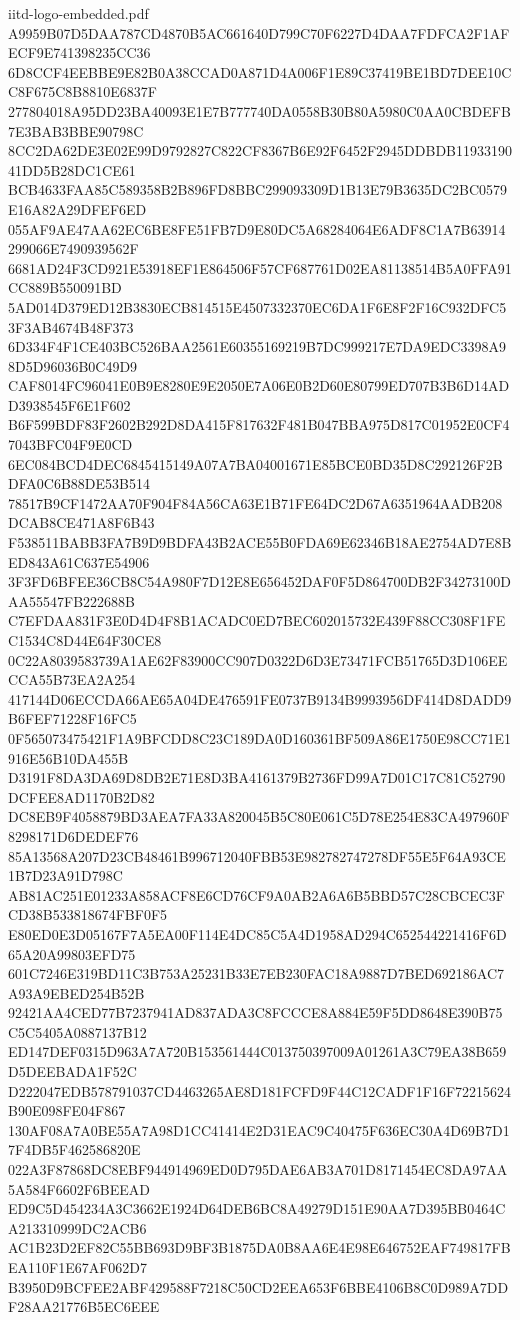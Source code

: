 \begin{filecontents*}[overwrite]{iitd-logo-embedded.pdf}
A9959B07D5DAA787CD4870B5AC661640D799C70F6227D4DAA7FDFCA2F1AFECF9E741398235CC36
6D8CCF4EEBBE9E82B0A38CCAD0A871D4A006F1E89C37419BE1BD7DEE10CC8F675C8B8810E6837F
277804018A95DD23BA40093E1E7B777740DA0558B30B80A5980C0AA0CBDEFB7E3BAB3BBE90798C
8CC2DA62DE3E02E99D9792827C822CF8367B6E92F6452F2945DDBDB1193319041DD5B28DC1CE61
BCB4633FAA85C589358B2B896FD8BBC299093309D1B13E79B3635DC2BC0579E16A82A29DFEF6ED
055AF9AE47AA62EC6BE8FE51FB7D9E80DC5A68284064E6ADF8C1A7B63914299066E7490939562F
6681AD24F3CD921E53918EF1E864506F57CF687761D02EA81138514B5A0FFA91CC889B550091BD
5AD014D379ED12B3830ECB814515E4507332370EC6DA1F6E8F2F16C932DFC53F3AB4674B48F373
6D334F4F1CE403BC526BAA2561E60355169219B7DC999217E7DA9EDC3398A98D5D96036B0C49D9
CAF8014FC96041E0B9E8280E9E2050E7A06E0B2D60E80799ED707B3B6D14ADD3938545F6E1F602
B6F599BDF83F2602B292D8DA415F817632F481B047BBA975D817C01952E0CF47043BFC04F9E0CD
6EC084BCD4DEC6845415149A07A7BA04001671E85BCE0BD35D8C292126F2BDFA0C6B88DE53B514
78517B9CF1472AA70F904F84A56CA63E1B71FE64DC2D67A6351964AADB208DCAB8CE471A8F6B43
F538511BABB3FA7B9D9BDFA43B2ACE55B0FDA69E62346B18AE2754AD7E8BED843A61C637E54906
3F3FD6BFEE36CB8C54A980F7D12E8E656452DAF0F5D864700DB2F34273100DAA55547FB222688B
C7EFDAA831F3E0D4D4F8B1ACADC0ED7BEC602015732E439F88CC308F1FEC1534C8D44E64F30CE8
0C22A8039583739A1AE62F83900CC907D0322D6D3E73471FCB51765D3D106EECCA55B73EA2A254
417144D06ECCDA66AE65A04DE476591FE0737B9134B9993956DF414D8DADD9B6FEF71228F16FC5
0F565073475421F1A9BFCDD8C23C189DA0D160361BF509A86E1750E98CC71E1916E56B10DA455B
D3191F8DA3DA69D8DB2E71E8D3BA4161379B2736FD99A7D01C17C81C52790DCFEE8AD1170B2D82
DC8EB9F4058879BD3AEA7FA33A820045B5C80E061C5D78E254E83CA497960F8298171D6DEDEF76
85A13568A207D23CB48461B996712040FBB53E982782747278DF55E5F64A93CE1B7D23A91D798C
AB81AC251E01233A858ACF8E6CD76CF9A0AB2A6A6B5BBD57C28CBCEC3FCD38B533818674FBF0F5
E80ED0E3D05167F7A5EA00F114E4DC85C5A4D1958AD294C652544221416F6D65A20A99803EFD75
601C7246E319BD11C3B753A25231B33E7EB230FAC18A9887D7BED692186AC7A93A9EBED254B52B
92421AA4CED77B7237941AD837ADA3C8FCCCE8A884E59F5DD8648E390B75C5C5405A0887137B12
ED147DEF0315D963A7A720B153561444C013750397009A01261A3C79EA38B659D5DEEBADA1F52C
D222047EDB578791037CD4463265AE8D181FCFD9F44C12CADF1F16F72215624B90E098FE04F867
130AF08A7A0BE55A7A98D1CC41414E2D31EAC9C40475F636EC30A4D69B7D17F4DB5F462586820E
022A3F87868DC8EBF944914969ED0D795DAE6AB3A701D8171454EC8DA97AA5A584F6602F6BEEAD
ED9C5D454234A3C3662E1924D64DEB6BC8A49279D151E90AA7D395BB0464CA213310999DC2ACB6
AC1B23D2EF82C55BB693D9BF3B1875DA0B8AA6E4E98E646752EAF749817FBEA110F1E67AF062D7
B3950D9BCFEE2ABF429588F7218C50CD2EEA653F6BBE4106B8C0D989A7DDF28AA21776B5EC6EEE

\end{filecontents*}
